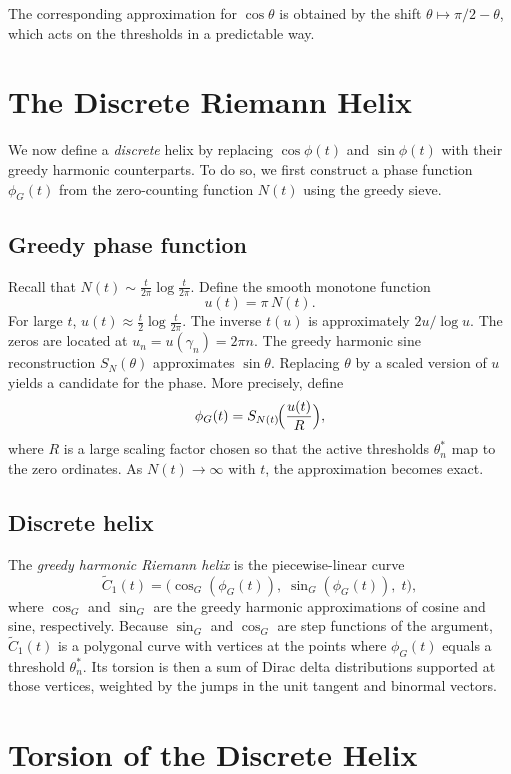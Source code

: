 \documentclass[12pt,a4paper]{article}
\begin{document}
The corresponding approximation for \(\cos\theta\) is obtained by the shift \(\theta\mapsto\pi/2-\theta\), which acts on the thresholds in a predictable way.

\section{The Discrete Riemann Helix}

We now define a \emph{discrete} helix by replacing \(\cos\phi(t)\) and \(\sin\phi(t)\) with their greedy harmonic counterparts.  To do so, we first construct a phase function \(\phi_G(t)\) from the zero-counting function \(N(t)\) using the greedy sieve.

\subsection{Greedy phase function}
Recall that \(N(t)\sim \frac{t}{2\pi}\log\frac{t}{2\pi}\).  Define the smooth monotone function
\[
u(t)=\pi\,N(t).
\]
For large \(t\), \(u(t)\approx \frac{t}{2}\log\frac{t}{2\pi}\).  The inverse \(t(u)\) is approximately \(2u/\log u\).  The zeros are located at \(u_n=u(\gamma_n)=2\pi n\).  The greedy harmonic sine reconstruction \(S_N(\theta)\) approximates \(\sin\theta\).  Replacing \(\theta\) by a scaled version of \(u\) yields a candidate for the phase.  More precisely, define
\[
\phi_G(t) = S_{N(t)}\!\Bigl( \frac{u(t)}{R} \Bigr),
\]
where \(R\) is a large scaling factor chosen so that the active thresholds \(\theta_n^*\) map to the zero ordinates.  As \(N(t)\to\infty\) with \(t\), the approximation becomes exact.

\subsection{Discrete helix}
The \emph{greedy harmonic Riemann helix} is the piecewise-linear curve
\[
\widetilde{C}_1(t) = \bigl( \cos_G(\phi_G(t)),\; \sin_G(\phi_G(t)),\; t \bigr),
\]
where \(\cos_G\) and \(\sin_G\) are the greedy harmonic approximations of cosine and sine, respectively.  Because \(\sin_G\) and \(\cos_G\) are step functions of the argument, \(\widetilde{C}_1(t)\) is a polygonal curve with vertices at the points where \(\phi_G(t)\) equals a threshold \(\theta_n^*\).  Its torsion is then a sum of Dirac delta distributions supported at those vertices, weighted by the jumps in the unit tangent and binormal vectors.

\section{Torsion of the Discrete Helix}
\end{document}
